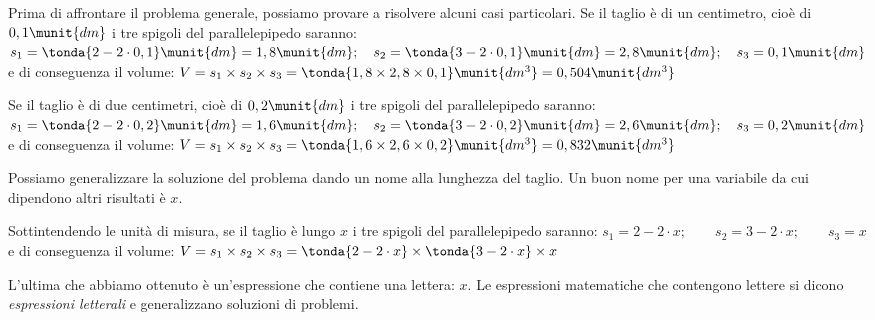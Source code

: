 \pagebreak %

Prima di affrontare il problema generale, possiamo provare a risolvere 
alcuni casi particolari.
Se il taglio è di un centimetro, cioè di \(0,1\munit{dm}\) i tre spigoli 
del parallelepipedo saranno: \\
\(s_1 = \tonda{2 - 2 \cdot 0,1}\munit{dm} = 1,8\munit{dm}; \quad 
  s_2 = \tonda{3 - 2 \cdot 0,1}\munit{dm} = 2,8\munit{dm}; \quad 
  s_3 = 0,1\munit{dm}\)\\
e di conseguenza il volume: \quad
\(V = s_1  \times s_2 \times s_3 = 
  \tonda{1,8 \times 2,8 \times 0,1} \munit{dm^3} = 0,504\munit{dm^3}\)

Se il taglio è di due centimetri, cioè di \(0,2\munit{dm}\) i tre spigoli 
del parallelepipedo saranno: \\
\(s_1 = \tonda{2 - 2 \cdot 0,2}\munit{dm} = 1,6\munit{dm}; \quad 
  s_2 = \tonda{3 - 2 \cdot 0,2}\munit{dm} = 2,6\munit{dm}; \quad 
  s_3 = 0,2\munit{dm}\)\\
e di conseguenza il volume: \quad
\(V = s_1  \times s_2 \times s_3 = 
  \tonda{1,6 \times 2,6 \times 0,2} \munit{dm^3} = 0,832\munit{dm^3}\)

Possiamo generalizzare la soluzione del problema dando un nome alla 
lunghezza del taglio. 
Un buon nome per una variabile da cui dipendono altri risultati è \(x\).

Sottintendendo le unità di misura, se il taglio è lungo \(x\) 
i tre spigoli del parallelepipedo saranno: \qquad
\(s_1 = 2 - 2 \cdot x; \qquad 
  s_2 = 3 - 2 \cdot x; \qquad 
  s_3 = x\)\\
e di conseguenza il volume: \qquad
\(V = s_1  \times s_2 \times s_3 = 
  \tonda{2 - 2 \cdot x} \times \tonda{3 - 2 \cdot x} \times x 
\)

L'ultima che abbiamo ottenuto è un'espressione che contiene una lettera: 
\(x\). 
Le espressioni matematiche che contengono lettere si dicono 
\emph{espressioni letterali} e generalizzano 
soluzioni di problemi.

